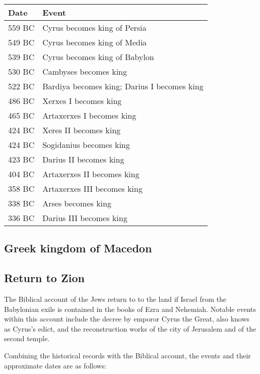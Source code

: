 \documentclass[]{article}
\begin{document}
\begin{center}
\begin{tabular}{ll}
\hline
Date & Event \\
\hline\hline
559 BC & Cyrus becomes king of Persia \\
549 BC & Cyrus becomes king of Media \\
539 BC & Cyrus becomes king of Babylon \\
530 BC & Cambyses becomes king \\
522 BC & Bardiya becomes king; Darius I becomes king \\
486 BC & Xerxes I becomes king \\
465 BC & Artaxerxes I becomes king \\
424 BC & Xeres II becomes king \\
424 BC & Sogidanius becomes king \\
423 BC & Darius II becomes king \\
404 BC & Artaxerxes II becomes king \\
358 BC & Artaxerxes III becomes king \\
338 BC & Arses becomes king \\
336 BC & Darius III becomes king \\
\end{tabular}
\end{center}


\subsection{Greek kingdom of Macedon}


\subsection{Return to Zion}
The Biblical account of the Jews return to to the land if Israel from the Babylonian exile is contained
in the books of Ezra and Nehemiah. Notable events within this account include the decree by emporor Cyrus the Great, also knows as Cyrus's edict, and the
reconstruction works of the city of Jerusalem and of the second temple.

Combining the historical records with the Biblical account, the events and their approximate dates are as follows:
\end{document}
